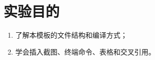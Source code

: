 \section{实验目的}

\begin{enumerate}
  \item 了解本模板的文件结构和编译方式；
  \item 学会插入截图、终端命令、表格和交叉引用。
\end{enumerate}
